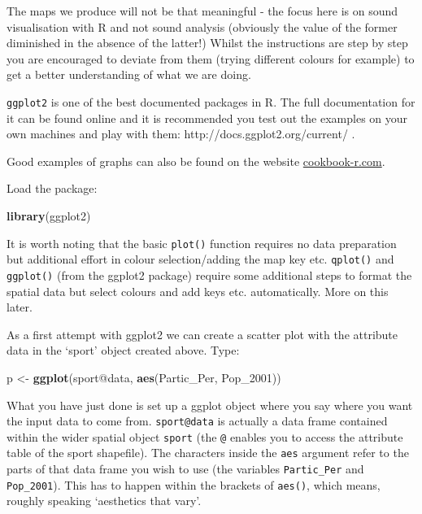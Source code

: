 \documentclass[]{article}
\newenvironment{Shaded}{}{}
\newcommand{\KeywordTok}[1]{\textcolor[rgb]{0.00,0.44,0.13}{\textbf{{#1}}}}
\newcommand{\StringTok}[1]{\textcolor[rgb]{0.25,0.44,0.63}{{#1}}}
\newcommand{\NormalTok}[1]{{#1}}
\begin{document}
The maps we produce will not be that meaningful - the focus here is on
sound visualisation with R and not sound analysis (obviously the value
of the former diminished in the absence of the latter!) Whilst the
instructions are step by step you are encouraged to deviate from them
(trying different colours for example) to get a better understanding of
what we are doing.

\texttt{ggplot2} is one of the best documented packages in R. The full
documentation for it can be found online and it is recommended you test
out the examples on your own machines and play with them:
http://docs.ggplot2.org/current/ .

Good examples of graphs can also be found on the website
\href{http://www.cookbook-r.com/Graphs/}{cookbook-r.com}.

Load the package:

\begin{Shaded}
\begin{Highlighting}[]
\KeywordTok{library}\NormalTok{(ggplot2)}
\end{Highlighting}
\end{Shaded}

It is worth noting that the basic \texttt{plot()} function requires no
data preparation but additional effort in colour selection/adding the
map key etc. \texttt{qplot()} and \texttt{ggplot()} (from the ggplot2
package) require some additional steps to format the spatial data but
select colours and add keys etc. automatically. More on this later.

As a first attempt with ggplot2 we can create a scatter plot with the
attribute data in the `sport' object created above. Type:

\begin{Shaded}
\begin{Highlighting}[]
\NormalTok{p <-}\StringTok{ }\KeywordTok{ggplot}\NormalTok{(sport@data, }\KeywordTok{aes}\NormalTok{(Partic_Per, Pop_2001))}
\end{Highlighting}
\end{Shaded}

What you have just done is set up a ggplot object where you say where
you want the input data to come from. \texttt{sport@data} is actually a
data frame contained within the wider spatial object \texttt{sport} (the
\texttt{@} enables you to access the attribute table of the sport
shapefile). The characters inside the \texttt{aes} argument refer to the
parts of that data frame you wish to use (the variables
\texttt{Partic\_Per} and \texttt{Pop\_2001}). This has to happen within
the brackets of \texttt{aes()}, which means, roughly speaking
`aesthetics that vary'.
\end{document}
